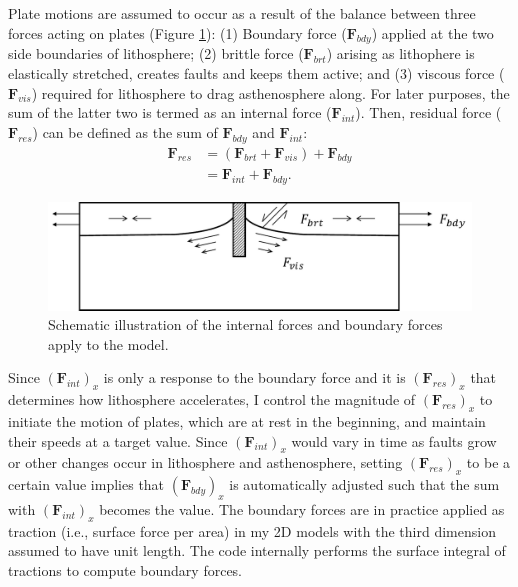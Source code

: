 \documentclass[letterpaper,12pt,notitle]{memphisthesis}                     %
\begin{document}
Plate motions are assumed to occur as a result of the balance between three forces acting on plates (Figure \ref{fig:forcescheme}): (1) Boundary force ($\mathbf{F}_{bdy}$) applied at the two side boundaries of lithosphere; (2) brittle force ($\boldsymbol{F}_{brt}$) arising as lithophere is elastically stretched, creates faults and keeps them active; %
and (3) viscous force ($\boldsymbol{F}_{vis}$) required for lithosphere to drag asthenosphere along. 
For later purposes, the sum of the latter two is termed as an internal force ($\boldsymbol{F}_{int}$). Then, residual force ($\boldsymbol{F}_{res}$) can be defined as the sum of $\boldsymbol{F}_{bdy}$ and $\boldsymbol{F}_{int}$:
%
\begin{align} \label{Fres}
\mathbf{F}_{res} & = (\mathbf{F}_{brt} + \mathbf{F}_{vis}) + \mathbf{F}_{bdy} \\
 & = \mathbf{F}_{int} + \mathbf{F}_{bdy}.
\end{align}
%
\begin{figure}[!htb]
	\centering
	\includegraphics[width=0.7\linewidth]{./figs/force.pdf}
	\caption{Schematic illustration of the internal forces and boundary forces apply to the model.}
	\label{fig:forcescheme}
\end{figure}

Since $(\boldsymbol{F}_{int})_{x}$ is only a response to the boundary force and it is $(\boldsymbol{F}_{res})_{x}$ that determines how lithosphere accelerates, I control the magnitude of $(\boldsymbol{F}_{res})_{x}$ to initiate the motion of plates, which are at rest in the beginning, and maintain their speeds at a target value. Since $(\boldsymbol{F}_{int})_{x}$ would vary in time as faults grow or other changes occur in lithosphere and asthenosphere, setting $(\boldsymbol{F}_{res})_{x}$ %
to be a certain value implies that $(\boldsymbol{F}_{bdy})_{x}$ is automatically adjusted such that the sum with $(\boldsymbol{F}_{int})_{x}$ becomes the value. The boundary forces are in practice applied as traction (i.e., surface force per area) in my 2D models with the third dimension assumed to have unit length. The code internally performs the surface integral of tractions to compute boundary forces.
\end{document}
